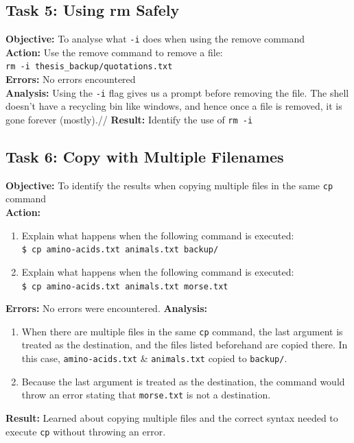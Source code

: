 \documentclass{article}
\begin{document}
\subsection{Task 5: Using rm Safely}
%
\textbf{Objective:} To analyse what \verb|-i| does when using the remove command\\
\textbf{Action:} Use the remove command to remove a file:\\\verb|rm -i thesis_backup/quotations.txt|\\
\textbf{Errors:} No errors encountered\\
\textbf{Analysis:} Using the \verb|-i| flag gives us a prompt before removing the file. The shell doesn't have a recycling bin like windows, and hence once a file is removed, it is gone forever (mostly).//
\textbf{Result:} Identify the use of \verb|rm -i|
%
\subsection{Task 6: Copy with Multiple Filenames}
%
\textbf{Objective:} To identify the results when copying multiple files in the same \verb|cp| command\\
\textbf{Action:}
\begin{enumerate}
    \item Explain what happens when the following command is executed:\\
    \verb|$ cp amino-acids.txt animals.txt backup/|
    \item Explain what happens when the following command is executed:\\
    \verb|$ cp amino-acids.txt animals.txt morse.txt |
\end{enumerate}
\textbf{Errors:} No errors were encountered.
\textbf{Analysis:}
\begin{enumerate}
    \item When there are multiple files in the same \verb|cp| command, the last argument is treated as the destination, and the files listed beforehand are copied there. In this case, \verb|amino-acids.txt| \& \texttt{animals.txt} copied to \verb|backup/|.
    \item Because the last argument is treated as the destination, the command would throw an error stating that \texttt{morse.txt} is not a destination.
\end{enumerate}
\textbf{Result:} Learned about copying multiple files and the correct syntax needed to execute \texttt{cp} without throwing an error.
%
\end{document}
